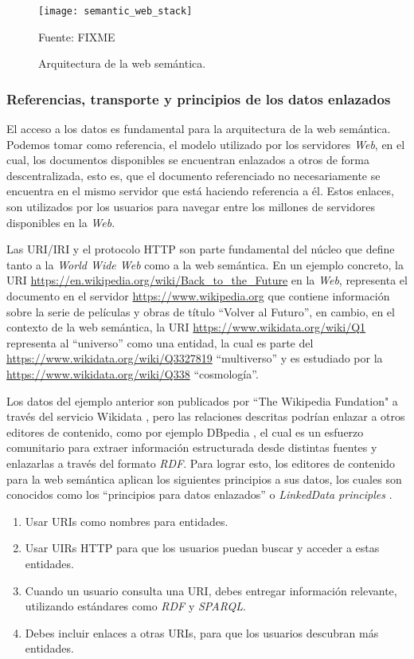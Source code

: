 \begin{figure}
    \label{fig:semantic-web-arq}
    \centering
    \texttt{[image: semantic\_web\_stack]}
    \caption{Arquitectura de la web semántica.} Fuente: FIXME
\end{figure}

\subsubsection{Referencias, transporte y principios de los datos enlazados}

El acceso a los datos es fundamental para la arquitectura de la web semántica.
Podemos tomar como referencia, el modelo utilizado por los servidores
\textit{Web}, en el cual, los documentos disponibles se encuentran enlazados a
otros de forma descentralizada, esto es, que el documento referenciado no
necesariamente se encuentra en el mismo servidor que está haciendo referencia a
él. Estos enlaces, son utilizados por los usuarios para navegar entre los
millones de servidores disponibles en la \textit{Web}.

Las URI/IRI y el protocolo HTTP son parte fundamental del
núcleo que define tanto a la \textit{World Wide Web} como a la web semántica. En
un ejemplo concreto, la URI
\url{https://en.wikipedia.org/wiki/Back_to_the_Future} en la \textit{Web},
representa el documento en el servidor \url{https://www.wikipedia.org} que contiene
información sobre la serie de películas y obras de título ``Volver al Futuro'',
en cambio, en el contexto de la web semántica, la URI
\url{https://www.wikidata.org/wiki/Q1} representa al ``universo'' como una
entidad, la cual es parte del \url{https://www.wikidata.org/wiki/Q3327819}
``multiverso'' y es estudiado por la \url{https://www.wikidata.org/wiki/Q338}
``cosmología''.

Los datos del ejemplo anterior son publicados por ``The Wikipedia
Fundation" a través del servicio Wikidata
\cite{vrandevcic2014wikidata}, pero las relaciones descritas podrían enlazar a
otros editores de contenido, como por ejemplo DBpedia
\cite{valsecchi2015dbpedia}, el cual es un esfuerzo comunitario para extraer
información estructurada desde distintas fuentes y enlazarlas a través del
formato \textit{RDF}. Para lograr esto, los editores de contenido para la web semántica
aplican los siguientes principios a sus datos, los cuales son conocidos como los
``principios para datos enlazados'' o \textit{LinkedData principles}
\cite{bizer2011linked}.

\begin{enumerate}
    \item Usar URIs como nombres para entidades.
    \item Usar UIRs HTTP para que los usuarios puedan buscar y acceder
    a estas entidades.
    \item Cuando un usuario consulta una URI, debes entregar
    información relevante, utilizando estándares como \textit{RDF} y \textit{SPARQL}.
    \item Debes incluir enlaces a otras URIs, para que los usuarios
    descubran más entidades.
\end{enumerate}

